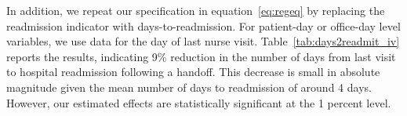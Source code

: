 \documentclass[final,12pt, notitlepage]{article}
\begin{document}
In addition, we repeat our specification in equation~\ref{eq:regeq} by replacing the readmission indicator with days-to-readmission.
For patient-day or office-day level variables, we use data for the day of last nurse visit. Table~\ref{tab:days2readmit_iv} reports the results, indicating 9\% reduction in the number of days from last visit to hospital readmission following a handoff. This decrease is small in absolute magnitude given the mean number of days to readmission of around 4 days. However, our estimated effects are statistically significant at the 1 percent level.



\end{document}
